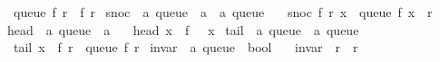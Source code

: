 \begin{isabellebody}
\ \ {\isachardoublequoteopen}queue\ {\isacharparenleft}{\kern0pt}f{\isacharcomma}{\kern0pt}\ r{\isacharparenright}{\kern0pt}\ {\isacharequal}{\kern0pt}\ {\isacharparenleft}{\kern0pt}f{\isacharcomma}{\kern0pt}\ r{\isacharparenright}{\kern0pt}{\isachardoublequoteclose}\isanewline
\isanewline
{}\isamarkupfalse%
\ snoc\ {\isacharcolon}{\kern0pt}{\isacharcolon}{\kern0pt}\ {\isachardoublequoteopen}{\isacharprime}{\kern0pt}a\ queue\ {\isasymRightarrow}\ {\isacharprime}{\kern0pt}a\ {\isasymRightarrow}\ {\isacharprime}{\kern0pt}a\ queue{\isachardoublequoteclose}\ \isanewline
\ \ {\isachardoublequoteopen}snoc\ {\isacharparenleft}{\kern0pt}f{\isacharcomma}{\kern0pt}\ r{\isacharparenright}{\kern0pt}\ x\ {\isacharequal}{\kern0pt}\ queue\ {\isacharparenleft}{\kern0pt}f{\isacharcomma}{\kern0pt}\ x\ {\isacharhash}{\kern0pt}\ r{\isacharparenright}{\kern0pt}{\isachardoublequoteclose}\isanewline
\isanewline
{}\isamarkupfalse%
\ head\ {\isacharcolon}{\kern0pt}{\isacharcolon}{\kern0pt}\ {\isachardoublequoteopen}{\isacharprime}{\kern0pt}a\ queue\ {\isasymRightarrow}\ {\isacharprime}{\kern0pt}a{\isachardoublequoteclose}\ \isanewline
\ \ {\isachardoublequoteopen}head\ {\isacharparenleft}{\kern0pt}x\ {\isacharhash}{\kern0pt}\ f{\isacharcomma}{\kern0pt}\ {\isacharunderscore}{\kern0pt}{\isacharparenright}{\kern0pt}\ {\isacharequal}{\kern0pt}\ x{\isachardoublequoteclose}\isanewline
\isanewline
{}\isamarkupfalse%
\ tail\ {\isacharcolon}{\kern0pt}{\isacharcolon}{\kern0pt}\ {\isachardoublequoteopen}{\isacharprime}{\kern0pt}a\ queue\ {\isasymRightarrow}\ {\isacharprime}{\kern0pt}a\ queue{\isachardoublequoteclose}\ \isanewline
\ \ {\isachardoublequoteopen}tail\ {\isacharparenleft}{\kern0pt}x\ {\isacharhash}{\kern0pt}\ f{\isacharcomma}{\kern0pt}\ r{\isacharparenright}{\kern0pt}\ {\isacharequal}{\kern0pt}\ queue\ {\isacharparenleft}{\kern0pt}f{\isacharcomma}{\kern0pt}\ r{\isacharparenright}{\kern0pt}{\isachardoublequoteclose}\isanewline
\isanewline
{}\isamarkupfalse%
\ invar\ {\isacharcolon}{\kern0pt}{\isacharcolon}{\kern0pt}\ {\isachardoublequoteopen}{\isacharprime}{\kern0pt}a\ queue\ {\isasymRightarrow}\ bool{\isachardoublequoteclose}\ \isanewline
\ \ {\isachardoublequoteopen}invar\ {\isacharparenleft}{\kern0pt}{\isacharbrackleft}{\kern0pt}{\isacharbrackright}{\kern0pt}{\isacharcomma}{\kern0pt}\ r{\isacharparenright}{\kern0pt}\ {\isasymlongleftrightarrow}\ r\ {\isacharequal}{\kern0pt}\ {\isacharbrackleft}{\kern0pt}{\isacharbrackright}{\kern0pt}{\isachardoublequoteclose}\ {\isacharbar}{\kern0pt}\isanewline

\end{isabellebody}

